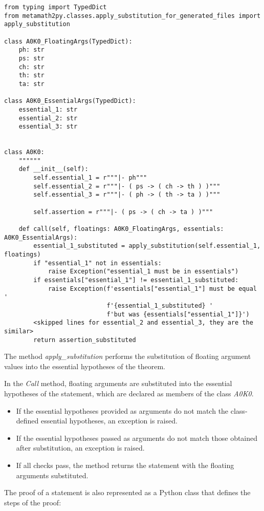 \newpage
\begin{verbatim}
from typing import TypedDict
from metamath2py.classes.apply_substitution_for_generated_files import apply_substitution

class A0K0_FloatingArgs(TypedDict):
    ph: str
    ps: str
    ch: str
    th: str
    ta: str

class A0K0_EssentialArgs(TypedDict):
    essential_1: str
    essential_2: str
    essential_3: str


class A0K0:
    """"""
    def __init__(self):
        self.essential_1 = r"""|- ph"""
        self.essential_2 = r"""|- ( ps -> ( ch -> th ) )"""
        self.essential_3 = r"""|- ( ph -> ( th -> ta ) )"""

        self.assertion = r"""|- ( ps -> ( ch -> ta ) )"""

    def call(self, floatings: A0K0_FloatingArgs, essentials: A0K0_EssentialArgs):
        essential_1_substituted = apply_substitution(self.essential_1, floatings)
        if "essential_1" not in essentials:
            raise Exception("essential_1 must be in essentials")
        if essentials["essential_1"] != essential_1_substituted:
            raise Exception(f'essentials["essential_1"] must be equal '
                            f'{essential_1_substituted} '
                            f'but was {essentials["essential_1"]}')
        <skipped lines for essential_2 and essential_3, they are the similar>
        return assertion_substituted
\end{verbatim}

The method \textit{apply\_substitution} performs the substitution of floating argument values into
the essential hypotheses of the theorem.

In the \textit{Call} method, floating arguments are substituted into the essential hypotheses of the statement,
which are declared as members of the class \textit{A0K0}.
\begin{itemize}
    \item If the essential hypotheses provided as arguments do not match the class-defined essential hypotheses, an exception is raised.
    \item If the essential hypotheses passed as arguments do not match those obtained after substitution, an exception is raised.
    \item If all checks pass, the method returns the statement with the floating arguments substituted.
\end{itemize}

The proof of a statement is also represented as a Python class that defines the steps of the proof:


